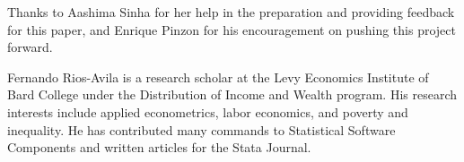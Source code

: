 \documentclass[bib]{statapress}
\begin{document}
Thanks to Aashima Sinha for her help in the preparation and providing
feedback for this paper, and Enrique Pinzon for his encouragement on
pushing this project forward.

\clearpage





\begin{aboutauthors}

Fernando Rios-Avila is a research scholar at the Levy Economics
Institute of Bard College under the Distribution of Income and Wealth
program. His research interests include applied econometrics, labor
economics, and poverty and inequality. He has contributed many commands
to Statistical Software Components and written articles for the Stata
Journal.

\end{aboutauthors}
\end{document}
